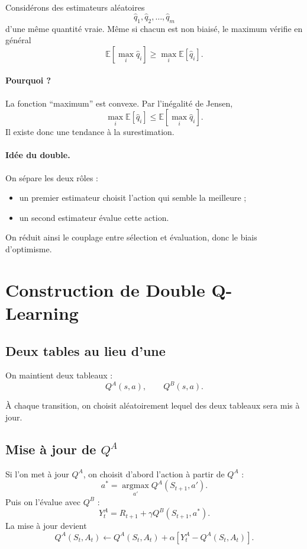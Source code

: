 \documentclass[11pt,a4paper]{article}
\newcommand{\E}{\mathbb{E}}
\newcommand{\argmax}{\operatorname*{argmax}}
\begin{document}
Considérons des estimateurs aléatoires
\[
\widehat q_1,\widehat q_2,\ldots,\widehat q_m
\]
d'une même quantité vraie. Même si chacun est non biaisé, le maximum vérifie en général
\[
\E\left[\max_i \widehat q_i\right] \ge \max_i \E[\widehat q_i].
\]

\paragraph{Pourquoi ?}
La fonction ``maximum'' est convexe. Par l'inégalité de Jensen,
\[
\max_i \E[\widehat q_i] \le \E\left[\max_i \widehat q_i\right].
\]
Il existe donc une tendance à la surestimation.

\paragraph{Idée du double.}
On sépare les deux rôles :
\begin{itemize}[leftmargin=1.6em]
    \item un premier estimateur choisit l'action qui semble la meilleure ;
    \item un second estimateur évalue cette action.
\end{itemize}
On réduit ainsi le couplage entre sélection et évaluation, donc le biais d'optimisme.

\section{Construction de Double Q-Learning}

\subsection{Deux tables au lieu d'une}

On maintient deux tableaux :
\[
Q^A(s,a), \qquad Q^B(s,a).
\]

À chaque transition, on choisit aléatoirement lequel des deux tableaux sera mis à jour.

\subsection{Mise à jour de $Q^A$}

Si l'on met à jour $Q^A$, on choisit d'abord l'action à partir de $Q^A$ :
\[
a^*=\argmax_{a'} Q^A(S_{t+1},a').
\]
Puis on l'évalue avec $Q^B$ :
\[
Y_t^{A} = R_{t+1}+\gamma Q^B(S_{t+1},a^*).
\]
La mise à jour devient
\[
Q^A(S_t,A_t)\leftarrow Q^A(S_t,A_t)+\alpha\left[Y_t^A-Q^A(S_t,A_t)\right].
\]
\end{document}
